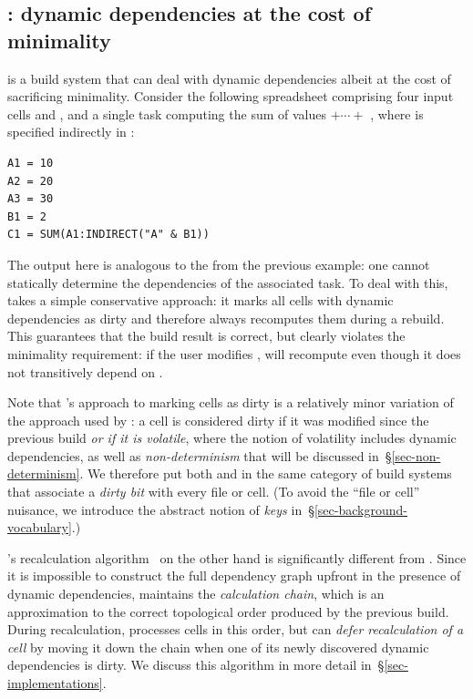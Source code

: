 \subsection{\Excel: dynamic dependencies at the cost of minimality}
\label{sec-background-excel}

\Excel is a build system that can deal with dynamic dependencies albeit at the
cost of sacrificing minimality. Consider the following spreadsheet comprising
four input cells  and , and a single task computing the sum
of values  $+\cdots+$ , where  is specified indirectly in
:

\vspace{1mm}
\begin{verbatim}
A1 = 10
A2 = 20
A3 = 30
B1 = 2
C1 = SUM(A1:INDIRECT("A" & B1))
\end{verbatim}
\vspace{1mm}

\noindent
The output  here is analogous to the  from the previous
example: one cannot statically determine the dependencies of the associated task.
To deal with this, \Excel takes a simple conservative approach: it marks all
cells with dynamic dependencies as dirty and therefore always recomputes them
during a rebuild. This guarantees that the build result is correct, but clearly
violates the minimality requirement: if the user modifies , \Excel will
recompute  even though it does not transitively depend on .

Note that \Excel's approach to marking cells as dirty is a relatively minor
variation of the approach used by \Make: a cell is considered dirty if it was
modified since the previous build \emph{or if it is volatile}, where the notion
of volatility includes dynamic dependencies, as well as \emph{non-determinism}
that will be discussed in~\S\ref{sec-non-determinism}. We therefore put both
\Make and \Excel in the same category of build systems that associate a
\emph{dirty bit} with every file or cell. (To avoid the ``file or cell''
nuisance, we introduce the abstract notion of \emph{keys}
in~\S\ref{sec-background-vocabulary}.)

\Excel's recalculation algorithm~\cite{excel_recalc} on the other hand is
significantly different from \Make. Since it is impossible to construct the full
dependency graph upfront in the presence of dynamic dependencies, \Excel
maintains the \emph{calculation chain}, which is an approximation to the correct
topological order produced by the previous build. During recalculation, \Excel
processes cells in this order, but can \emph{defer recalculation of a cell} by
moving it down the chain when one of its newly discovered dynamic dependencies
is dirty. We discuss this algorithm in more detail in~\S\ref{sec-implementations}.

